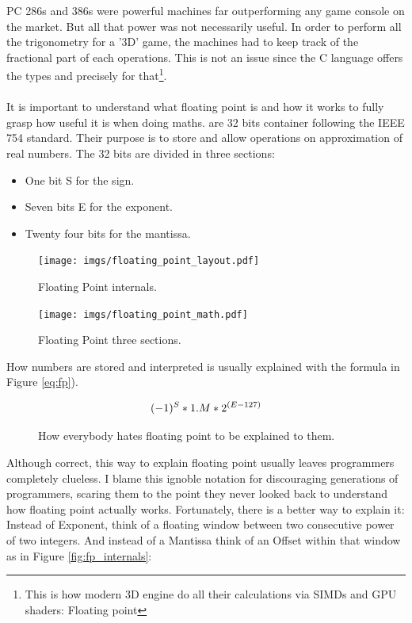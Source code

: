 \documentclass[book.tex]{subfiles}
\begin{document}
   PC 286s and 386s were powerful machines far outperforming any game console on the market. But all that power was not necessarily useful. In order to perform all the trigonometry for a '3D' game, the machines had to keep track of the fractional part of each operations. This is not an issue since the C language offers the types  and  precisely for that\footnote{This is how modern 3D engine do all their calculations via SIMDs and GPU shaders: Floating point}.\\
\\
It is important to understand what floating point is and how it works to fully grasp how useful it is when doing maths.  are 32 bits container following the IEEE 754 standard. Their purpose is to store and allow operations on approximation of real numbers. The 32 bits are divided in three sections:\\
\begin{itemize}
  \item One bit S for the sign.
  \item Seven bits E for the exponent.
  \item Twenty four bits for the mantissa.
\end{itemize} 

\begin{figure}[H]
\centering
\texttt{[image: imgs/floating\_point\_layout.pdf]}
\caption{Floating Point internals.}
\end{figure}
  \bigskip



\begin{figure}[H]
\centering
\texttt{[image: imgs/floating\_point\_math.pdf]}
\caption{Floating Point three sections.}
\end{figure}
  \bigskip  


How numbers are stored and interpreted is usually explained with the formula in Figure \ref{eq:fp}).\

\begin{figure}[H]
\begin{equation}\label{eq:fp}
\large
(-1)^S * 1.M * 2^{(E-127)}
\end{equation}
 \caption{How everybody hates floating point to be explained to them.}
\end{figure}
\bigskip  

Although correct, this way to explain floating point usually leaves programmers completely clueless. I blame this ignoble notation for discouraging generations of programmers, scaring them to the point they never looked back to understand how floating point actually works. Fortunately, there is a better way to explain it: Instead of Exponent, think of a floating window between two consecutive power of two integers. And instead of a Mantissa think of an Offset within that window as in Figure \ref{fig:fp_internals}:
  
\end{document}
